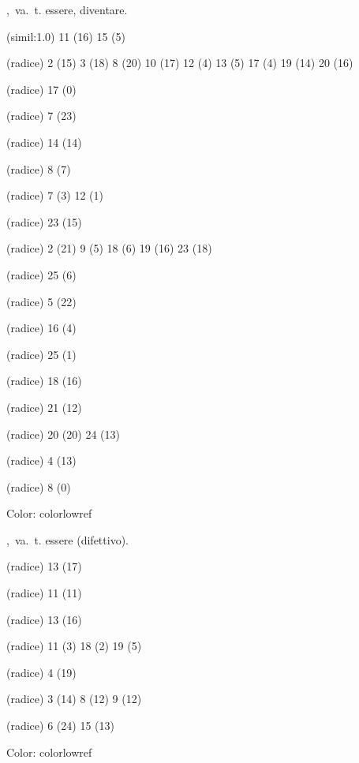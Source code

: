 ,\ va.\ t.
essere, diventare.
\begin{subvocedue}
\item[(simil:1.0)]   11 (16) 15 (5)
\item[(radice)]   2 (15) 3 (18) 8 (20) 10 (17) 12 (4) 13 (5) 17 (4) 19 (14) 20 (16)
\item[(radice)]   17 (0)
\item[(radice)]   7 (23)
\item[(radice)]   14 (14)
\item[(radice)]   8 (7)
\item[(radice)]   7 (3) 12 (1)
\item[(radice)]   23 (15)
\item[(radice)]   2 (21) 9 (5) 18 (6) 19 (16) 23 (18)
\item[(radice)]   25 (6)
\item[(radice)]   5 (22)
\item[(radice)]   16 (4)
\item[(radice)]   25 (1)
\item[(radice)]   18 (16)
\item[(radice)]   21 (12)
\item[(radice)]   20 (20) 24 (13)
\item[(radice)]   4 (13)
\item[(radice)]   8 (0)
\end{subvocedue}
Color: colorlowref

,\ va.\ t.
essere (difettivo).
\begin{subvocedue}
\item[(radice)]   13 (17)
\item[(radice)]   11 (11)
\item[(radice)]   13 (16)
\item[(radice)]   11 (3) 18 (2) 19 (5)
\item[(radice)]   4 (19)
\item[(radice)]   3 (14) 8 (12) 9 (12)
\item[(radice)]   6 (24) 15 (13)
\end{subvocedue}
Color: colorlowref

